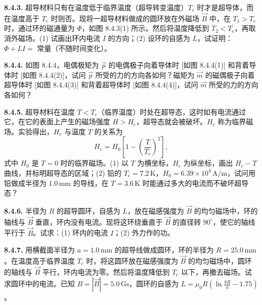 \vfill
\newpage

\textbf{8.4.3.} 超导材料只有在温度低于临界温度（超导转变温度）$T_{\mathrm{c}}$ 时才是超导体，而在温度高于 $T_{\mathrm{c}}$ 时则否。现将一超导材料做成的圆环放在外磁场 $\vec{B}$ 中，在 $T_{1} > T_{\mathrm{c}}$ 时，通过环的磁通量为 $\Phi$，如图 8.4.3(1) 所示。然后将温度降低到 $T_{2} < T_{\mathrm{c}}$，再取消外磁场。(1) 试画出环内电流 $I$ 的方向；(2) 设环的自感为 $L$，试证明：$\Phi + LI =$ 常量（不随时间变化）。

\begin{center}
\end{center}

\vfill
\newpage

\textbf{8.4.4.} 如图 8.4.4，电偶极矩为 $\vec{p}$ 的电偶极子向着导体时 [如图 8.4.4(1)] 和背着导体时 [如图 8.4.4(2)]，试问 $\vec{p}$ 所受的力的方向各如何？磁矩为 $\vec{m}$ 的磁偶极子向着超导体时 [如图 8.4.4(3)] 和背着超导体时 [如图 8.4.4(4)]，试问 $\vec{m}$ 所受的力的方向各如何？

\begin{center}
\end{center}

\vfill
\newpage

\textbf{8.4.5.} 超导材料在温度 $T < T_{\mathrm{c}}$（临界温度）时处在超导态，这时如有电流通过它，在它的表面上产生的磁场强度 $H > H_{\mathrm{c}}$，超导态就会被破坏。$H_{\mathrm{c}}$ 称为临界磁场。实验得出，$H_{\mathrm{c}}$ 与温度 $T$ 的关系为
\[
H_{\mathrm{c}} = H_{0} \left[ 1 - \left(\frac{T}{T_{\mathrm{c}}}\right)^{2} \right],
\]
式中 $H_{0}$ 是 $T = 0$ 时的临界磁场。(1) 以 $T$ 为横坐标，$H_{\mathrm{c}}$ 为纵坐标，画出 $H_{\mathrm{c}}-T$ 曲线，并标明超导态的区域；(2) 铅的 $T_{\mathrm{c}} = 7.2\,\mathrm{K}$，$H_{0} = 6.39 \times 10^{4}\,\mathrm{A/m}$，试问用铅做成半径为 $1.0\,\mathrm{mm}$ 的导线，在 $T = 3.6\,\mathrm{K}$ 时能通过多大的电流而不破坏超导态？

\vfill
\newpage

\textbf{8.4.6.} 半径为 $R$ 的超导圆环，自感为 $L$，放在磁感强度为 $\vec{B}$ 的均匀磁场中，环的轴线与 $\vec{B}$ 垂直，环内没有电流。现将这环绕垂直于 $\vec{B}$ 的直径转 $90^{\circ}$，使它的轴线平行于 $\vec{B}$。试求：(1) 环内的电流 $I$；(2) 外力作的功。

\vfill
\newpage

\textbf{8.4.7.} 用横截面半径为 $a = 1.0\,\mathrm{mm}$ 的超导线做成圆环，环的半径为 $R = 25.0\,\mathrm{mm}$。在温度高于临界温度 $T_{\mathrm{c}}$ 时，将这圆环放在磁感强度为 $\vec{B}$ 的均匀磁场中，圆环的轴线与 $\vec{B}$ 平行，环内电流为零。然后将温度降低到 $T_{\mathrm{c}}$ 以下，再撤去磁场。试求圆环中的电流。已知 $B = |\vec{B}| = 5.0\,\mathrm{Gs}$，圆环的自感为 $\displaystyle L = \mu_0 R \left(\ln \frac{8R}{a} - 1.75\right)$。

\vfill
\newpage
